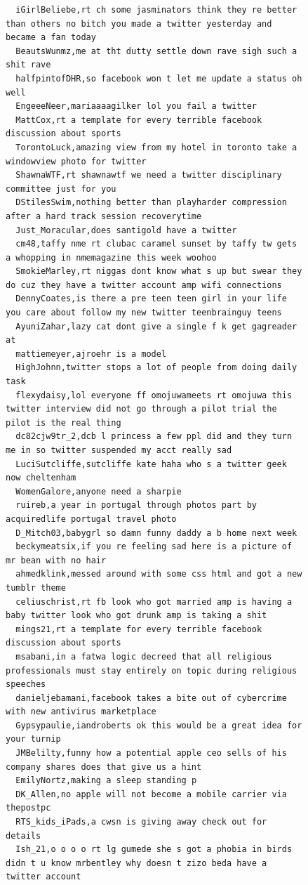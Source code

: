 \begin{figure}[htpb]
\begin{verbatim}
  iGirlBeliebe,rt ch some jasminators think they re better than others no bitch you made a twitter yesterday and became a fan today
  BeautsWunmz,me at tht dutty settle down rave sigh such a shit rave
  halfpintofDHR,so facebook won t let me update a status oh well
  EngeeeNeer,mariaaaagilker lol you fail a twitter
  MattCox,rt a template for every terrible facebook discussion about sports
  TorontoLuck,amazing view from my hotel in toronto take a windowview photo for twitter
  ShawnaWTF,rt shawnawtf we need a twitter disciplinary committee just for you
  DStilesSwim,nothing better than playharder compression after a hard track session recoverytime
  Just_Moracular,does santigold have a twitter
  cm48,taffy nme rt clubac caramel sunset by taffy tw gets a whopping in nmemagazine this week woohoo
  SmokieMarley,rt niggas dont know what s up but swear they do cuz they have a twitter account amp wifi connections
  DennyCoates,is there a pre teen teen girl in your life you care about follow my new twitter teenbrainguy teens
  AyuniZahar,lazy cat dont give a single f k get gagreader at
  mattiemeyer,ajroehr is a model
  HighJohnn,twitter stops a lot of people from doing daily task
  flexydaisy,lol everyone ff omojuwameets rt omojuwa this twitter interview did not go through a pilot trial the pilot is the real thing
  dc82cjw9tr_2,dcb l princess a few ppl did and they turn me in so twitter suspended my acct really sad
  LuciSutcliffe,sutcliffe kate haha who s a twitter geek now cheltenham
  WomenGalore,anyone need a sharpie
  ruireb,a year in portugal through photos part by acquiredlife portugal travel photo
  D_Mitch03,babygrl so damn funny daddy a b home next week
  beckymeatsix,if you re feeling sad here is a picture of mr bean with no hair
  ahmedklink,messed around with some css html and got a new tumblr theme
  celiuschrist,rt fb look who got married amp is having a baby twitter look who got drunk amp is taking a shit
  mings21,rt a template for every terrible facebook discussion about sports
  msabani,in a fatwa logic decreed that all religious professionals must stay entirely on topic during religious speeches
  danieljebamani,facebook takes a bite out of cybercrime with new antivirus marketplace
  Gypsypaulie,iandroberts ok this would be a great idea for your turnip
  JMBelilty,funny how a potential apple ceo sells of his company shares does that give us a hint
  EmilyNortz,making a sleep standing p
  DK_Allen,no apple will not become a mobile carrier via thepostpc
  RTS_kids_iPads,a cwsn is giving away check out for details
  Ish_21,o o o o rt lg gumede she s got a phobia in birds didn t u know mrbentley why doesn t zizo beda have a twitter account

\end{verbatim}
\end{figure}
